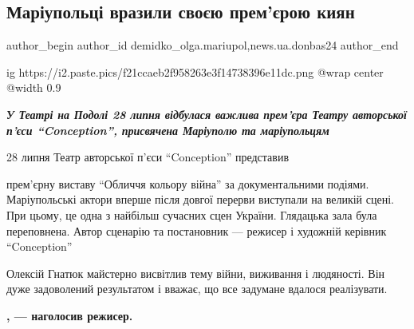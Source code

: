  
 
 
 
 
 
\subsection{Маріупольці вразили своєю прем'єрою киян}
\label{sec:29_07_2022.stz.news.ua.donbas24.1.mariupolci_vrazyly_kyjan}
 
\ifcmt
 author_begin
   author_id demidko_olga.mariupol,news.ua.donbas24
 author_end
\fi

\ifcmt
  ig https://i2.paste.pics/f21ccaeb2f958263e3f14738396e11dc.png
  @wrap center
  @width 0.9
\fi

\begin{center}
\em\color{blue}\bfseries\Large
У Театрі на Подолі 28 липня відбулася важлива прем'єра Театру авторської п'єси
\enquote{Conception}, присвячена Маріуполю та маріупольцям
\end{center}

28 липня Театр авторської п'єси \enquote{Conception} представив\par\noindent прем'єрну виставу
\enquote{Обличчя кольору війна} за документальними подіями. Маріупольські актори вперше
після довгої перерви виступали на великій сцені. При цьому, це одна з найбільш
сучасних сцен України. Глядацька зала була переповнена. Автор сценарію та
постановник — режисер і художній керівник \enquote{Conception}\par\noindent Олексій Гнатюк майстерно
висвітлив тему війни, виживання і людяності. Він дуже задоволений результатом і
вважає, що все задумане вдалося реалізувати. 

\begin{leftbar}
	\begingroup
		\bfseries
{}, — наголосив
режисер. 
	\endgroup
\end{leftbar}

